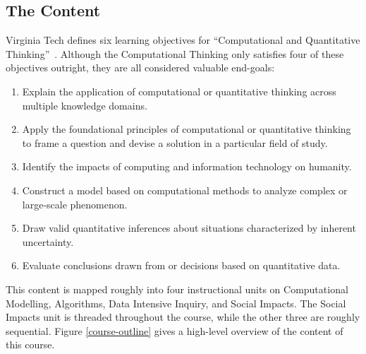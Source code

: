 \subsection{The Content}

Virginia Tech defines six learning objectives for ``Computational and Quantitative Thinking''~\cite{vt-vision}. Although the Computational Thinking only satisfies four of these objectives outright, they are all considered valuable end-goals:
\begin{enumerate}
	\item Explain the application of computational or quantitative thinking across multiple knowledge domains.
	\item Apply the foundational principles of computational or quantitative thinking to frame a question and devise a solution in a particular field of study.
	\item Identify the impacts of computing and information technology on humanity.
	\item Construct a model based on computational methods to analyze complex or large-scale phenomenon.
	\item Draw valid quantitative inferences about situations characterized by inherent uncertainty.
	\item Evaluate conclusions drawn from or decisions based on quantitative data.
\end{enumerate}

This content is mapped roughly into four instructional units on Computational Modelling, Algorithms, Data Intensive Inquiry, and Social Impacts. The Social Impacts unit is threaded throughout the course, while the other three are roughly sequential. Figure \ref{course-outline} gives a high-level overview of the content of this course.

